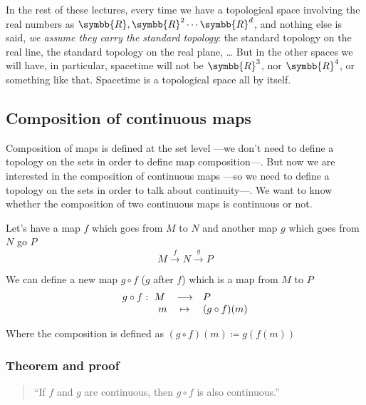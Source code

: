   In the rest of these lectures, every time we have a topological space involving the
  real numbers as $\symbb{R}, \symbb{R}^2 \cdots \symbb{R}^d$, and nothing else is said,
  \emph{we assume they carry the standard topology}: the standard topology on the real
  line, the standard topology on the real plane, \dots
  But in the other spaces we will have, in particular, spacetime will not be
  $\symbb{R}^3$, nor $\symbb{R}^4$, or something like that. Spacetime is a topological
  space all by itself.

  \subsection{Composition of continuous maps}
  Composition of maps is defined at the set level ---we don't need to define a topology
  on the sets in order to define map composition---.
  But now we are interested in the composition of continuous maps ---so we need to
  define a topology on the sets in order to talk about continuity---. We want to know
  whether the composition of two continuous maps is continuous or not.

  Let's have a map $f$ which goes from $M$ to $N$ and another map $g$ which goes from
  $N$ go $P$
  \[
    M
    \xrightarrow{\hspace{4pt}f\hspace{4pt}} N \xrightarrow{\hspace{5pt}g\hspace{5pt}}
    P
  \]

  We can define a new map $g\circ f$ ($g$ after $f$) which is a map from $M$ to $P$
  \[
    \begin{array}{rccl}
      g\circ f:& \hspace{-6pt}M & \longrightarrow & P \\
      &  m & \mapsto & (g\circ f)(m)
    \end{array}
  \]

  Where the composition is defined as $(g\circ f) (m) \coloneq g(f(m))$

  \subsubsection{Theorem and proof}
  \begin{quote}
    ``If $f$ and $g$ are continuous, then $g\circ f$ is also continuous.''
  \end{quote}

